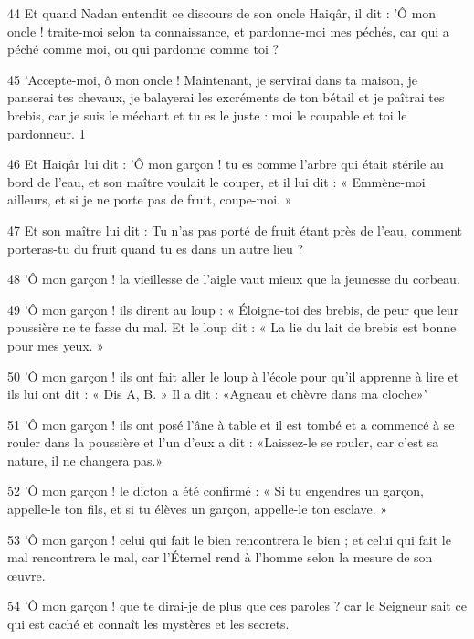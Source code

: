 \par 44 Et quand Nadan entendit ce discours de son oncle Haiqâr, il dit : 'Ô mon oncle ! traite-moi selon ta connaissance, et pardonne-moi mes péchés, car qui a péché comme moi, ou qui pardonne comme toi ?

\par 45 'Accepte-moi, ô mon oncle ! Maintenant, je servirai dans ta maison, je panserai tes chevaux, je balayerai les excréments de ton bétail et je paîtrai tes brebis, car je suis le méchant et tu es le juste : moi le coupable et toi le pardonneur. 1

\par 46 Et Haiqâr lui dit : 'Ô mon garçon ! tu es comme l'arbre qui était stérile au bord de l'eau, et son maître voulait le couper, et il lui dit : « Emmène-moi ailleurs, et si je ne porte pas de fruit, coupe-moi. »

\par 47 Et son maître lui dit : Tu n'as pas porté de fruit étant près de l'eau, comment porteras-tu du fruit quand tu es dans un autre lieu ?

\par 48 'Ô mon garçon ! la vieillesse de l'aigle vaut mieux que la jeunesse du corbeau.

\par 49 'Ô mon garçon ! ils dirent au loup : « Éloigne-toi des brebis, de peur que leur poussière ne te fasse du mal. Et le loup dit : « La lie du lait de brebis est bonne pour mes yeux. »

\par 50 'Ô mon garçon ! ils ont fait aller le loup à l'école pour qu'il apprenne à lire et ils lui ont dit : « Dis A, B. » Il a dit : «Agneau et chèvre dans ma cloche»'

\par 51 'Ô mon garçon ! ils ont posé l'âne à table et il est tombé et a commencé à se rouler dans la poussière et l'un d'eux a dit : «Laissez-le se rouler, car c'est sa nature, il ne changera pas.»

\par 52 'Ô mon garçon ! le dicton a été confirmé : « Si tu engendres un garçon, appelle-le ton fils, et si tu élèves un garçon, appelle-le ton esclave. »

\par 53 'Ô mon garçon ! celui qui fait le bien rencontrera le bien ; et celui qui fait le mal rencontrera le mal, car l'Éternel rend à l'homme selon la mesure de son œuvre.

\par 54 'Ô mon garçon ! que te dirai-je de plus que ces paroles ? car le Seigneur sait ce qui est caché et connaît les mystères et les secrets.

